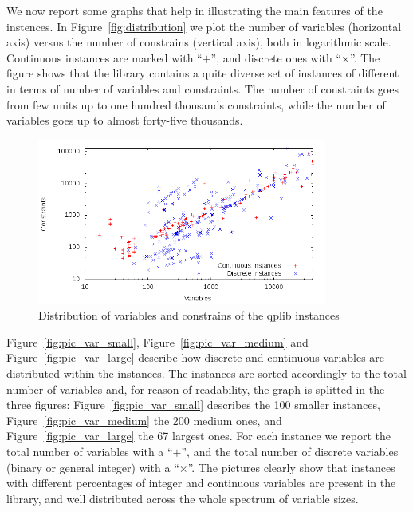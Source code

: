 We now report some graphs that help in illustrating the main features
of the instences. In Figure~\ref{fig:distribution} we plot the number
of variables (horizontal axis) versus the number of constrains
(vertical axis), both in logarithmic scale. Continuous instances are
marked with ``$+$'', and discrete ones with ``$\times$''. The figure shows
that the library contains a quite diverse set of instances of different in
terms of number of variables and constraints. The number of constraints goes
from few units up to one hundred thousands constraints, while the number of
variables goes up to almost forty-five thousands.

\begin{figure}\centering
  \includegraphics[width=0.85\textwidth]{pic_overview.png}
  \caption{Distribution of variables and constrains  of the qplib
instances \label{fig:1}}
\end{figure}

Figure~\ref{fig:pic_var_small}, Figure~\ref{fig:pic_var_medium} and
Figure~\ref{fig:pic_var_large} describe how discrete and continuous
variables are distributed within the instances. The instances are
sorted accordingly to the total number of variables and, for reason of
readability, the graph is splitted in the three figures:
Figure~\ref{fig:pic_var_small} describes the 100 smaller instances,
Figure~\ref{fig:pic_var_medium} the 200 medium ones, and
Figure~\ref{fig:pic_var_large} the 67 largest ones. For each instance
we report the total number of variables with a ``$+$'', and the total
number of discrete variables (binary or general integer) with a
``$\times$''. The pictures clearly show that instances with different
percentages of integer and continuous variables are present in the
library, and well distributed across the whole spectrum of variable
sizes.

